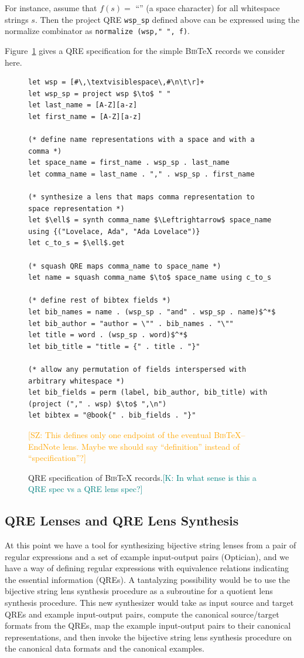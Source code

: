 \documentclass[acmsmall,review,anonymous]{acmart}
\newcommand{\FINISH}[3]{\ifdraft\textcolor{#1}{[#2: #3]}\fi}
\newcommand{\saz}[1]{\FINISH{orange}{SZ}{#1}}
\newcommand{\ksf}[1]{\FINISH{teal}{K}{#1}}
\newcommand{\bibtex}{\textsc{Bib}\TeX{}}
\begin{document}
For instance, assume that $f(s)=$ ``\textvisiblespace'' (a space
character) for all whitespace strings $s$. Then the 
project QRE \lstinline{wsp_sp} defined above can
be expressed using the normalize combinator as
\lstinline{normalize (wsp," ", f)}.

Figure~\ref{fig:example-qre} gives a QRE specification for the simple
\bibtex{} records we consider here.
\begin{figure}
\begin{lstlisting}
let wsp = [#\,\textvisiblespace\,#\n\t\r]+
let wsp_sp = project wsp $\to$ " "
let last_name = [A-Z][a-z]
let first_name = [A-Z][a-z]

(* define name representations with a space and with a comma *)
let space_name = first_name . wsp_sp . last_name
let comma_name = last_name . "," . wsp_sp . first_name

(* synthesize a lens that maps comma representation to space representation *)
let $\ell$ = synth comma_name $\Leftrightarrow$ space_name using {("Lovelace, Ada", "Ada Lovelace")}
let c_to_s = $\ell$.get

(* squash QRE maps comma_name to space_name *)
let name = squash comma_name $\to$ space_name using c_to_s

(* define rest of bibtex fields *)
let bib_names = name . (wsp_sp . "and" . wsp_sp . name)$^*$
let bib_author = "author = \"" . bib_names . "\""
let title = word . (wsp_sp . word)$^*$
let bib_title = "title = {" . title . "}"

(* allow any permutation of fields interspersed with arbitrary whitespace *)
let bib_fields = perm (label, bib_author, bib_title) with (project ("," . wsp) $\to$ ",\n")
let bibtex = "@book{" . bib_fields . "}"
\end{lstlisting}
\caption{QRE specification of \bibtex{} records.\ksf{In what sense is this a QRE
spec vs a QRE lens spec?}}\saz{This defines only one endpoint of the eventual
\bibtex{}--EndNote lens.  Maybe we should say ``definition'' instead of ``specification''?}
\label{fig:example-qre}
\end{figure}


\subsection{QRE Lenses and QRE Lens Synthesis}
\label{sec:examplesynth}
At this point we have a tool for synthesizing bijective string lenses from a
pair of regular expressions and a set of example input-output pairs
(Optician), 
and we have a way of defining regular expressions with equivalence
relations indicating the essential information (QREs).
A tantalyzing possibility would be to use the bijective string lens
synthesis procedure as a subroutine for a quotient lens synthesis procedure. 
This new synthesizer would take as input source and target QREs and 
example input-output pairs, 
compute the canonical source/target formats from the QREs, 
map the example input-output pairs to their canonical representations,
and then invoke the bijective string lens synthesis procedure on the canonical data
formats and the canonical examples.
\end{document}
